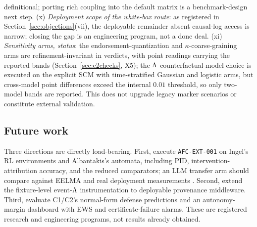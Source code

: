 definitional; porting rich coupling into the default matrix is a
benchmark-design next step. (x) \emph{Deployment scope of the white-box
route}: as registered in Section~\ref{sec:objections}(vii), the deployable
remainder absent causal-log access is narrow; closing the gap is an
engineering program, not a done deal. (xi) \emph{Sensitivity arms, status}: the
endorsement-quantization and $\kappa$-coarse-graining arms are
refinement-invariant in verdicts, with point readings carrying the reported
bands (Section~\ref{sec:e2checks}, X5); the $\Lambda$ counterfactual-model choice
is executed on the explicit SCM with time-stratified Gaussian and logistic
arms, but cross-model point differences exceed the internal $0.01$ threshold,
so only two-model bands are reported. This does not upgrade legacy marker
scenarios or constitute external validation.

\subsection{Future work}\label{sec:future}

Three directions are directly load-bearing. First, execute
\texttt{AFC-EXT-001} on Ingel's RL environments and Albantakis's automata,
including PID, intervention-attribution accuracy, and the reduced comparators;
an LLM transfer arm should compare against EELMA \citep{song2026eelma} and real
deployment measurements \citep{anthropic2026agents}. Second, extend the
fixture-level event-$\Lambda$ instrumentation to deployable provenance
middleware. Third, evaluate
C1/C2's normal-form defense predictions and an autonomy-margin dashboard with
EWS and certificate-failure alarms. These are registered research and
engineering programs, not results already obtained.